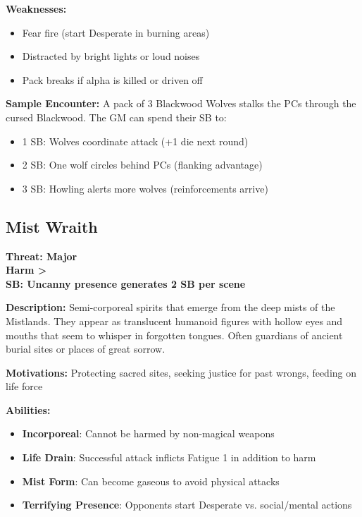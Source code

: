 \documentclass[12pt]{article}
\newcommand{\cp}[1]{\textbf{SB: #1}}
\newcommand{\harm}[1]{\textbf{Harm #1}}
\newcommand{\threat}[1]{\textbf{Threat: #1}}
\begin{document}
\textbf{Weaknesses:} 
\begin{itemize}
\item Fear fire (start Desperate in burning areas)
\item Distracted by bright lights or loud noises
\item Pack breaks if alpha is killed or driven off
\end{itemize}

\textbf{Sample Encounter:}
A pack of 3 Blackwood Wolves stalks the PCs through the cursed Blackwood. The GM can spend their SB to:
\begin{itemize}
\item 1 SB: Wolves coordinate attack (+1 die next round)
\item 2 SB: One wolf circles behind PCs (flanking advantage)
\item 3 SB: Howling alerts more wolves (reinforcements arrive)
\end{itemize}

\subsection*{Mist Wraith}

\threat{Major} \\
\harm{>} \\
\cp{Uncanny presence generates 2 SB per scene}

\vspace{0.5em}
\textbf{Description:} Semi-corporeal spirits that emerge from the deep mists of the Mistlands. They appear as translucent humanoid figures with hollow eyes and mouths that seem to whisper in forgotten tongues. Often guardians of ancient burial sites or places of great sorrow.

\textbf{Motivations:} Protecting sacred sites, seeking justice for past wrongs, feeding on life force

\textbf{Abilities:}
\begin{itemize}
\item \textbf{Incorporeal}: Cannot be harmed by non-magical weapons
\item \textbf{Life Drain}: Successful attack inflicts Fatigue 1 in addition to harm
\item \textbf{Mist Form}: Can become gaseous to avoid physical attacks
\item \textbf{Terrifying Presence}: Opponents start Desperate vs. social/mental actions
\end{itemize}
\end{document}
